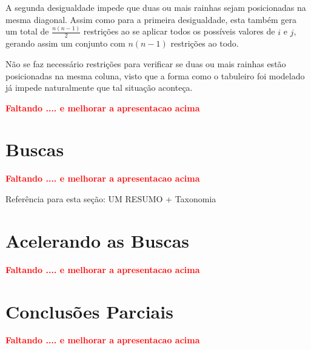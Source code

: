 A segunda desigualdade impede que duas ou mais rainhas sejam posicionadas na mesma diagonal. Assim como para a primeira desigualdade, esta também gera um total de $\frac{n(n-1)}{2}$ restrições ao se aplicar todos os possíveis valores de $i$ e $j$, gerando assim um conjunto com $n(n-1)$ restrições ao todo.

Não se faz necessário restrições para verificar se duas ou mais rainhas estão posicionadas na mesma coluna, visto que a forma como o tabuleiro foi modelado já impede naturalmente que tal situação aconteça.



{\bf \textcolor{red}{Faltando .... e melhorar a apresentacao acima}}

\section{Buscas}
{\bf \textcolor{red}{Faltando .... e melhorar a apresentacao acima}}

Referência para esta seção: \cite{rina2003}
UM RESUMO + Taxonomia

\section{Acelerando as Buscas}
{\bf \textcolor{red}{Faltando .... e melhorar a apresentacao acima}}




\section{Conclusões Parciais}
{\bf \textcolor{red}{Faltando .... e melhorar a apresentacao acima}}
